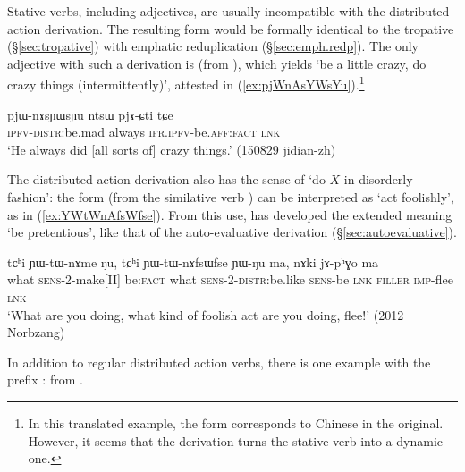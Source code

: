 
Stative verbs, including adjectives, are usually incompatible with the distributed action derivation. The resulting form would be formally identical to the tropative (§\ref{sec:tropative}) with emphatic reduplication (§\ref{sec:emph.redp}). The only adjective with such a derivation is  (from ), which yields  `be a little crazy, do crazy things (intermittently)', attested in (\ref{ex:pjWnAsYWsYu}).\footnote{
In this translated example, the form  corresponds to Chinese  in the original. However, it seems that the derivation turns the stative verb into a dynamic one. } 

\begin{exe}
\ex \label{ex:pjWnAsYWsYu}
\gll pjɯ-nɤsɲɯsɲu ntsɯ pjɤ-ɕti tɕe  \\
\textsc{ipfv}-\textsc{distr}:be.mad always \textsc{ifr}.\textsc{ipfv}-be.\textsc{aff}:\textsc{fact} \textsc{lnk} \\
\glt `He always did [all sorts of] crazy things.' (150829 jidian-zh) 
\end{exe}

The distributed action derivation also has the sense of `do $X$ in disorderly fashion': the form  (from the similative verb ) can be interpreted as `act foolishly', as in (\ref{ex:YWtWnAfsWfse}). From this use,  has developed the extended meaning `be pretentious', like that of the auto-evaluative derivation (§\ref{sec:autoevaluative}).

\begin{exe}
\ex \label{ex:YWtWnAfsWfse}
\gll tɕʰi ɲɯ-tɯ-nɤme ŋu, tɕʰi ɲɯ-tɯ-nɤfsɯfse ɲɯ-ŋu ma, nɤki jɤ-pʰɣo ma \\
what \textsc{sens}-2-make[II] be:\textsc{fact} what \textsc{sens}-2-\textsc{distr}:be.like \textsc{sens}-be \textsc{lnk} \textsc{filler} \textsc{imp}-flee \textsc{lnk} \\
\glt `What are you doing, what kind of foolish act are you doing, flee!' (2012 Norbzang)
\end{exe}

In addition to regular distributed action verbs, there is one example with the prefix :  from .

